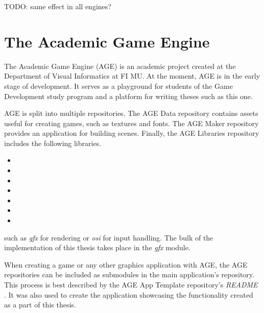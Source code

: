 \documentclass[
  digital,     %
  oneside,     %
  nosansbold,  %
  nocolorbold, %
  lof,         %
  lot,         %
]{fithesis4}
\begin{document}
TODO: same effect in all engines?



\chapter{The Academic Game Engine}
The Academic Game Engine (AGE) is an academic project created at the Department of Visual Informatics
at FI MU. At the moment, AGE is in the early stage of development. It serves as a playground for students
of the Game Development study program and a platform for writing theses such as this one.

AGE is split into multiple repositories.
The AGE Data repository contains assets useful for creating games, such as textures and fonts.
The AGE Maker repository provides an application for building scenes. Finally, the AGE Libraries
repository includes the following libraries.

\begin{itemize}
    \item 
    \item 
    \item 
    \item 
    \item 
    \item 
    \item 
\end{itemize}






such as \textit{gfx} for rendering or \textit{osi} for input handling.
The bulk of the implementation of this thesis takes place in the \textit{gfx} module.

When creating a game or any other graphics application with AGE, the AGE repositories can be included as submodules
in the main application's repository. This process is best described by the AGE App Template repository's
\textit{README} \cite{age-app-template-readme}. It was also used to create the application
showcasing the functionality created as a part of this thesis.
\end{document}
